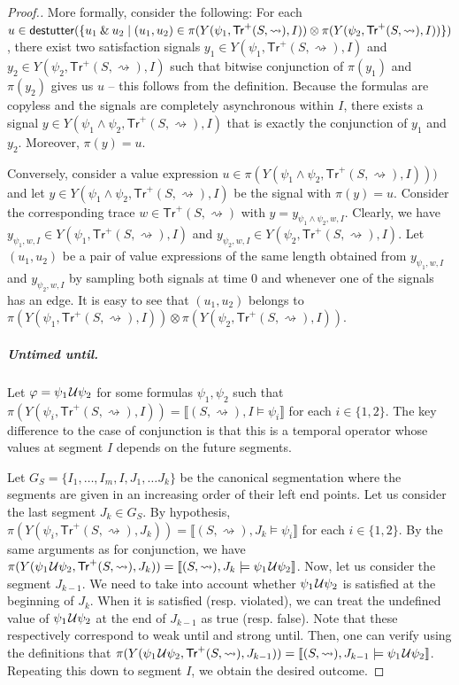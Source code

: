 \documentclass[iicol,lineno]{sn-jnl}
\newcommand{\hb}{\rightsquigarrow}
\newcommand{\tr}{\mathsf{Tr}}
\newcommand{\destutter}{\mathsf{destutter}}
\newcommand*\BitAnd{\mathbin{\&}}
\def\until{\kern.1em\mathcal{U}}
\newcommand{\?}{\text{?}}
\newcommand{\suchthat}{\;\ifnum\currentgrouptype=16 \middle\fi|\;}
\let\st\suchthat
\begin{document}
\begin{proof}[\normalsize Proof.]
		More formally, consider the following:
		For each $u \in \destutter(\{ u_1 \BitAnd u_2 \st (u_1,u_2) \in \pi(Y(\psi_1, \tr^+(S,{\hb}), I)) \otimes \pi(Y(\psi_2, \tr^+(S,{\hb}), I))\})$, there exist two satisfaction signals $y_1 \in Y(\psi_1, \tr^+(S,{\hb}), I)$ and $y_2 \in Y(\psi_2, \tr^+(S,{\hb}), I)$ such that bitwise conjunction of $\pi(y_1)$ and $\pi(y_2)$ gives us $u$ -- this follows from the definition.
		Because the formulas are copyless and the signals are completely asynchronous within $I$, there exists a signal $y \in Y(\psi_1 \land \psi_2, \tr^+(S,{\hb}), I)$ that is exactly the conjunction of $y_1$ and $y_2$.
		Moreover, $\pi(y) = u$.
		
		Conversely, consider a value expression $u \in \pi(Y(\psi_1 \land \psi_2, \tr^+(S,{\hb}), I)))$ and let $y \in Y(\psi_1 \land \psi_2, \tr^+(S,{\hb}), I)$ be the signal with $\pi(y) = u$.
		Consider the corresponding trace $w \in \tr^+(S,{\hb})$ with $y = y_{\psi_1 \land \psi_2, w, I}$.
		Clearly, we have $y_{\psi_1, w, I} \in Y(\psi_1, \tr^+(S,{\hb}), I)$ and $y_{\psi_2, w, I} \in Y(\psi_2, \tr^+(S,{\hb}), I)$.
		Let $(u_1,u_2)$ be a pair of value expressions of the same length obtained from $y_{\psi_1, w, I}$ and $y_{\psi_2, w, I}$ by sampling both signals at time 0 and whenever one of the signals has an edge.
		It is easy to see that $(u_1,u_2)$ belongs to $\pi(Y(\psi_1, \tr^+(S,{\hb}), I)) \otimes \pi(Y(\psi_2, \tr^+(S,{\hb}), I))$.
		
		\subparagraph*{Untimed until.}
		Let $\varphi = \psi_1 \until \psi_2$ for some formulas $\psi_1, \psi_2$ such that $\pi(Y(\psi_i, \tr^+(S,{\hb}), I)) = \llbracket (S,{\hb}), I \models \psi_i \rrbracket$ for each $i \in \{1,2\}$.
		The key difference to the case of conjunction is that this is a temporal operator whose values at segment $I$ depends on the future segments.
		
		Let $G_S = \{ I_1, \ldots, I_m, I, J_1, \ldots J_k \}$ be the canonical segmentation where the segments are given in an increasing order of their left end points.
		Let us consider the last segment $J_k \in G_S$.
		By hypothesis, $\pi(Y(\psi_i, \tr^+(S,{\hb}), J_k)) = \llbracket (S,{\hb}), J_k \models \psi_i \rrbracket$ for each $i \in \{1,2\}$.
		By the same arguments as for conjunction, we have $\pi(Y(\psi_1 \until \psi_2, \tr^+(S,{\hb}), J_k)) = \llbracket (S,{\hb}), J_k \models \psi_1 \until \psi_2 \rrbracket$.
		Now, let us consider the segment $J_{k-1}$.
		We need to take into account whether $\psi_1 \until \psi_2$ is satisfied at the beginning of $J_k$.
		When it is satisfied (resp. violated), we can treat the undefined value of $\psi_1 \until \psi_2$ at the end of $J_{k-1}$ as true (resp. false).
		Note that these respectively correspond to weak until and strong until.
		Then, one can verify using the definitions that $\pi(Y(\psi_1 \until \psi_2, \tr^+(S,{\hb}), J_{k-1})) = \llbracket (S,{\hb}), J_{k-1} \models \psi_1 \until \psi_2 \rrbracket$.
		Repeating this down to segment $I$, we obtain the desired outcome.
		

\end{proof}
\end{document}
